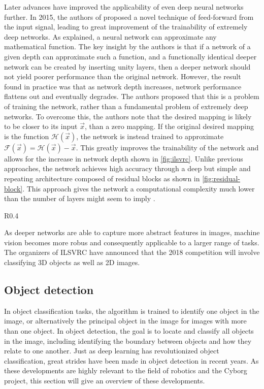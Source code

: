 \documentclass[\rootfolder/main.tex]{subfiles}
\begin{document}
Later advances have improved the applicability of even deep neural networks further.
In 2015, the authors of \cite{He2016} proposed a novel technique of feed-forward from the input signal, leading to great improvement of the trainability of extremely deep networks.
As explained, a neural network can approximate any mathematical function.
The key insight by the authors is that if a network of a given depth can approximate such a function, and a functionally identical deeper network can be created by inserting unity layers, then a deeper network should not yield poorer performance than the original network.
However, the result found in practice was that as network depth increases, network performance flattens out and eventually degrades.
The authors proposed that this is a problem of training the network, rather than a fundamental problem of extremely deep networks.
To overcome this, the authors note that the desired mapping is likely to be closer to its input $\vec{x}$, than a zero mapping.
If the original desired mapping is the function $\mathcal{H}(\vec{x})$, the network is instead trained to approximate $\mathcal{F}(\vec{x}) = \mathcal{H}(\vec{x}) - \vec{x}$.
This greatly improves the trainability of the network and allows for the increase in network depth shown in \cref{fig:ilsvrc}.
Unlike previous approaches, the network achieves high accuracy through a deep but simple and repeating architecture composed of residual blocks as shown in \cref{fig:residual-block}.
This approach gives the network a computational complexity much lower than the number of layers might seem to imply \cite{He2016}.

\begin{wrapfigure}{R}{0.4\columnwidth}
    \caption{Residual block \cite{He2016}.\label{fig:residual-block}}
\end{wrapfigure}

As deeper networks are able to capture more abstract features in images, machine vision becomes more robus and consequently applicable to a larger range of tasks.
The organizers of ILSVRC have announced that the 2018 competition will involve classifying 3D objects as well as 2D images.

\subsection{Object detection}

In object classification tasks, the algorithm is trained to identify one object in the image, or alternatively the principal object in the image for images with more than one object.
In object detection, the goal is to locate and classify all objects in the image, including identifying the boundary between objects and how they relate to one another.
Just as deep learning has revolutionized object classification, great strides have been made in object detection in recent years.
As these developments are highly relevant to the field of robotics and the Cyborg project, this section will give an overview of these developments.
\end{document}
